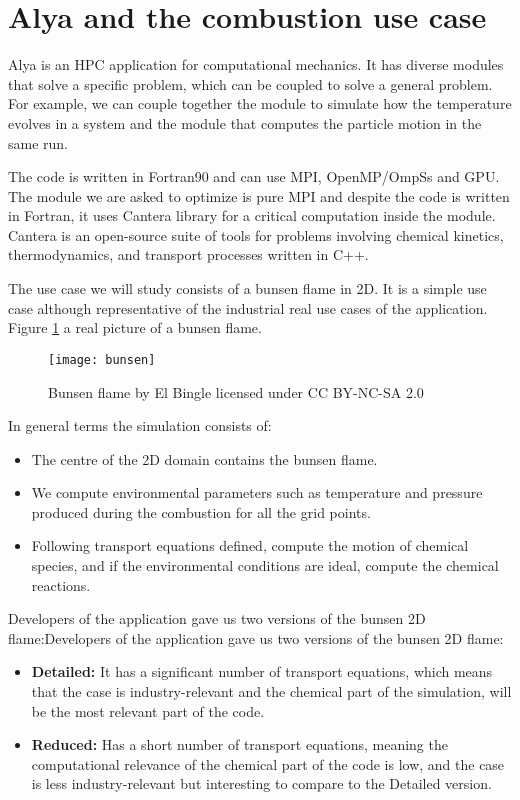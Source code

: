 \section{Alya and the combustion use case}
Alya is an HPC application for computational mechanics. It has diverse modules that solve a specific problem, which can be coupled to solve a general problem. For example, we can couple together the module to simulate how the temperature evolves in a system and the module that computes the particle motion in the same run. 

The code is written in Fortran90 and can use MPI, OpenMP/OmpSs and GPU. The module we are asked to optimize is pure MPI and despite the code is written in Fortran, it uses Cantera library for a critical computation inside the module. Cantera\cite{cantera} is an open-source suite of tools for problems involving chemical kinetics, thermodynamics, and transport processes written in C++.

The use case we will study consists of a bunsen flame in 2D. It is a simple use case although representative of the industrial real use cases of the application. Figure \ref{bunsen} a real picture of a bunsen flame. 

\begin{figure}[h]
  \centering
  \texttt{[image: bunsen]}
  \caption[Bunsen flame]{Bunsen flame by El Bingle licensed under CC BY-NC-SA 2.0}
  \label{bunsen}
\end{figure}
  

In general terms the simulation consists of:
\begin{itemize}
  \item The centre of the 2D domain contains the bunsen flame.
  \item We compute environmental parameters such as temperature and pressure produced during the combustion for all the grid points.
  \item Following transport equations defined, compute the motion of chemical species, and if the environmental conditions are ideal, compute the chemical reactions.
\end{itemize}

Developers of the application gave us two versions of the bunsen 2D flame:Developers of the application gave us two versions of the bunsen 2D flame:

\begin{itemize}
  \item \textbf{Detailed:} It has a significant number of transport equations, which means that the case is industry-relevant and the chemical part of the simulation, will be the most relevant part of the code.

  \item \textbf{Reduced:} Has a short number of transport equations, meaning the computational relevance of the chemical part of the code is low, and the case is less industry-relevant but interesting to compare to the Detailed version.
\end{itemize}

